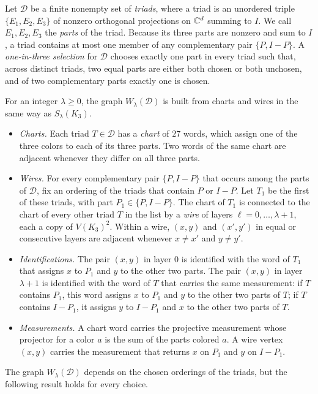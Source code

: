 Let $\mathcal D$ be a finite nonempty set of \emph{triads}, where a triad is an unordered triple $\{E_1,E_2,E_3\}$ of nonzero orthogonal projections on $\mathbb C^d$ summing to $I$. We call $E_1,E_2,E_3$ the \emph{parts} of the triad. Because its three parts are nonzero and sum to $I$, a triad contains at most one member of any complementary pair $\{P,I-P\}$. A \emph{one-in-three selection} for $\mathcal D$ chooses exactly one part in every triad such that, across distinct triads, two equal parts are either both chosen or both unchosen, and of two complementary parts exactly one is chosen.

For an integer $\lambda\ge0$, the graph $W_\lambda(\mathcal D)$ is built from charts and wires in the same way as $S_\lambda(K_3)$.
\begin{itemize}
\item \emph{Charts.} Each triad $T\in\mathcal D$ has a \emph{chart} of $27$ words, which assign one of the three colors to each of its three parts. Two words of the same chart are adjacent whenever they differ on all three parts.
\item \emph{Wires.} For every complementary pair $\{P,I-P\}$ that occurs among the parts of $\mathcal D$, fix an ordering of the triads that contain $P$ or $I-P$. Let $T_1$ be the first of these triads, with part $P_1\in\{P,I-P\}$. The chart of $T_1$ is connected to the chart of every other triad $T$ in the list by a \emph{wire} of layers $\ell=0,\ldots,\lambda+1$, each a copy of $V(K_3)^2$. Within a wire, $(x,y)$ and $(x',y')$ in equal or consecutive layers are adjacent whenever $x\ne x'$ and $y\ne y'$.
\item \emph{Identifications.} The pair $(x,y)$ in layer $0$ is identified with the word of $T_1$ that assigns $x$ to $P_1$ and $y$ to the other two parts. The pair $(x,y)$ in layer $\lambda+1$ is identified with the word of $T$ that carries the same measurement: if $T$ contains $P_1$, this word assigns $x$ to $P_1$ and $y$ to the other two parts of $T$; if $T$ contains $I-P_1$, it assigns $y$ to $I-P_1$ and $x$ to the other two parts of $T$.
\item \emph{Measurements.} A chart word carries the projective measurement whose projector for a color $a$ is the sum of the parts colored $a$. A wire vertex $(x,y)$ carries the measurement that returns $x$ on $P_1$ and $y$ on $I-P_1$.
\end{itemize}
The graph $W_\lambda(\mathcal D)$ depends on the chosen orderings of the triads, but the following result holds for every choice.


